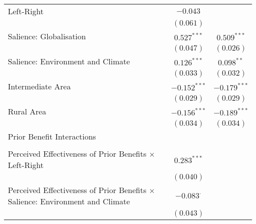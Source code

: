 \begin{center}
\begin{tiny}
\begin{longtable}{l@{} c@{} c@{}}
\quad Left-Right                                                                           & $-0.043$         &                  \\
                                                                                           & $(0.061)$        &                  \\
\quad Salience: Globalisation                                                              & $0.527^{***}$    & $0.509^{***}$    \\
                                                                                           & $(0.047)$        & $(0.026)$        \\
\quad Salience: Environment and Climate                                                    & $0.126^{***}$    & $0.098^{**}$     \\
                                                                                           & $(0.033)$        & $(0.032)$        \\
\quad Intermediate Area                                                                    & $-0.152^{***}$   & $-0.179^{***}$   \\
                                                                                           & $(0.029)$        & $(0.029)$        \\
\quad Rural Area                                                                           & $-0.156^{***}$   & $-0.189^{***}$   \\
                                                                                           & $(0.034)$        & $(0.034)$        \\
Prior Benefit Interactions                                                                 &                  &                  \\
                                                                                           &                  &                  \\
\quad Perceived Effectiveness of Prior Benefits $\times$ Left-Right                        & $0.283^{***}$    &                  \\
                                                                                           & $(0.040)$        &                  \\
\quad Perceived Effectiveness of Prior Benefits $\times$ Salience: Environment and Climate & $-0.083^{\cdot}$ &                  \\
                                                                                           & $(0.043)$        &                  \\

\end{longtable}
\end{tiny}
\end{center}

